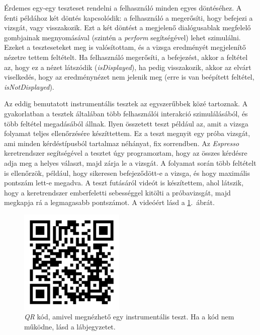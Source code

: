\documentclass[12pt,a4paper]{article}
\begin{document}
	Érdemes egy-egy teszteset rendelni a felhasználó minden egyes döntéséhez. A fenti példához két döntés kapcsolódik: a felhasználó a megerősíti, hogy befejezi a vizsgát, vagy visszakozik. Ezt a két döntést a megjelenő dialógusablak megfelelő gombjainak megnyomásával (szintén a \textit{perform} segítségével) lehet szimulálni. Ezeket a teszteseteket meg is valósítottam, és a vizsga eredményét megjelenítő nézetre tettem feltételt. Ha felhasználó megerősíti, a befejezést, akkor a feltétel az, hogy ez a nézet látszódik (\textit{isDisplayed}), ha pedig visszakozik, akkor az elvárt viselkedés, hogy az eredménynézet nem jelenik meg (erre is van beépített feltétel, \textit{isNotDisplayed}).
	
	Az eddig bemutatott instrumentális tesztek az egyszerűbbek közé tartoznak. A gyakorlatban a tesztek általában több felhasználói interakció szimulálásából, és több feltétel megadásából állnak. Ilyen összetett teszt például az, amit a vizsga folyamat teljes ellenőrzésére készíttettem. Ez a teszt megnyit egy próba vizsgát, ami minden kérdéstípusból tartalmaz néhányat, fix sorrendben. Az \textit{Espresso} keretrendszer segítségével a tesztet úgy programoztam, hogy az összes kérdésre adja meg a helyes választ, majd zárja le a vizsgát. A folyamat során több feltételt is ellenőrzök, például, hogy sikeresen befejeződött-e a vizsga, és hogy maximális pontszám lett-e megadva. A teszt futásáról videót is készítettem, ahol látszik, hogy a keretrendszer emberfeletti sebességgel kitölti a próbavizsgát, majd megkapja rá a legmagasabb pontszámot. A videóért lásd a \ref{qr_instrumental_test}.\ ábrát.
	
	\begin{figure}[h!]
		\centering
		\includegraphics[width=5cm]{instrumental_test_qr_code}
		\caption[Alkalmazás instrumentális teszt Caption]{\textit{QR} kód, amivel megnézhető egy instrumentális teszt. Ha a kód nem működne, lásd a lábjegyzetet\footnotemark.}
		\label{qr_instrumental_test}
	\end{figure}
	
\end{document}
